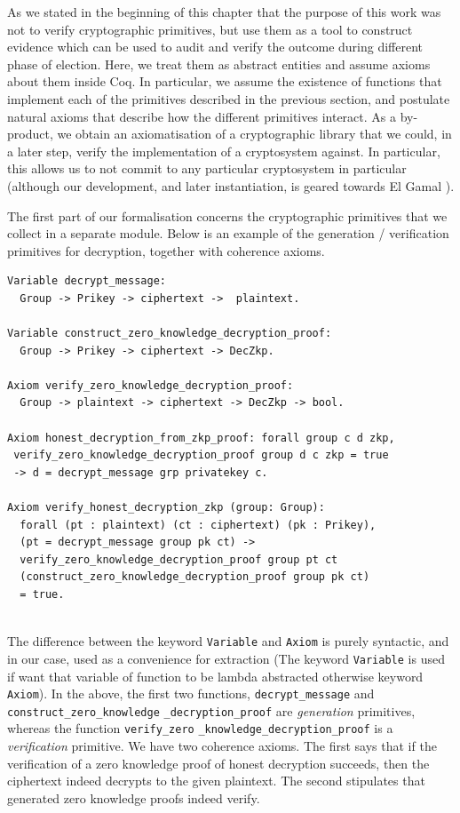 As we stated in the beginning of this chapter that the purpose of this work was 
not to verify cryptographic primitives, 
but use them as a tool to construct evidence which can be used 
to audit and verify the outcome during different phase 
of election. Here, we treat them as abstract entities and assume
axioms about them inside Coq.
In particular, we assume the existence of functions that implement
each of the primitives described in the previous section, and
postulate natural axioms that describe how the different primitives
interact. As a by-product, we obtain an axiomatisation of a
cryptographic library that we could, in a later step, verify the
implementation of a cryptosystem against.  In particular, this
allows us to not commit to any particular cryptosystem in particular
(although our development, and later instantiation, is geared
towards El Gamal \citep{DBLP:conf/crypto/Gamal84}).

The first part of our formalisation concerns the cryptographic
primitives that we collect in a separate module. Below is an example
of the generation / verification primitives for decryption, together
with coherence axioms.
\begin{lstlisting}[frame=single,basicstyle=\ttfamily\footnotesize]
Variable decrypt_message: 
  Group -> Prikey -> ciphertext ->  plaintext.

Variable construct_zero_knowledge_decryption_proof:
  Group -> Prikey -> ciphertext -> DecZkp.

Axiom verify_zero_knowledge_decryption_proof:
  Group -> plaintext -> ciphertext -> DecZkp -> bool.

Axiom honest_decryption_from_zkp_proof: forall group c d zkp, 
 verify_zero_knowledge_decryption_proof group d c zkp = true 
 -> d = decrypt_message grp privatekey c.
 
Axiom verify_honest_decryption_zkp (group: Group):
  forall (pt : plaintext) (ct : ciphertext) (pk : Prikey),
  (pt = decrypt_message group pk ct) ->
  verify_zero_knowledge_decryption_proof group pt ct 
  (construct_zero_knowledge_decryption_proof group pk ct) 
  = true.
  

\end{lstlisting}
  
\noindent
The difference between the keyword \texttt{Variable} and \texttt{Axiom}
is purely syntactic, and in our case, used as a convenience for 
extraction (The keyword  \texttt{Variable} is used if want that variable of function 
to be lambda abstracted otherwise keyword \texttt{Axiom}). In
the above, the first two functions, \texttt{decrypt\_message} and
\texttt{construct\_zero\_knowledge} \texttt{\_decryption\_proof} are
\emph{generation} primitives, whereas the function 
\texttt{verify\_zero} \texttt{\_knowledge\_decryption\_proof} is a
\emph{verification} primitive. We have two coherence axioms. The
first says that if the verification of a zero knowledge proof of
honest decryption succeeds, then the ciphertext indeed decrypts to
the given plaintext. The second stipulates that generated zero
knowledge proofs indeed verify. 

